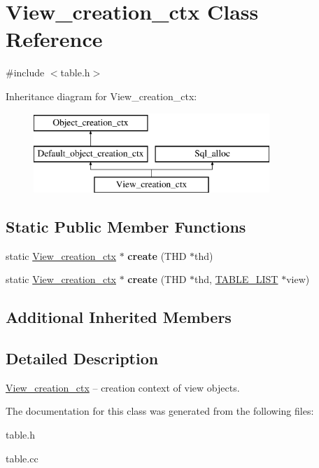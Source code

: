 \hypertarget{classView__creation__ctx}{}\section{View\+\_\+creation\+\_\+ctx Class Reference}
\label{classView__creation__ctx}


{\ttfamily \#include $<$table.\+h$>$}

Inheritance diagram for View\+\_\+creation\+\_\+ctx\+:\begin{figure}[H]
\begin{center}
\leavevmode
\includegraphics[height=3.000000cm]{classView__creation__ctx}
\end{center}
\end{figure}
\subsection*{Static Public Member Functions}
\begin{DoxyCompactItemize}
\item 
\mbox{\label{classView__creation__ctx_a33e3e418ba5867222080f959ceda6c57}} 
static \mbox{\hyperlink{classView__creation__ctx}{View\+\_\+creation\+\_\+ctx}} $\ast$ {\bfseries create} (T\+HD $\ast$thd)
\item 
\mbox{\label{classView__creation__ctx_a830b549cb83d6698f00f4cc5940a6a17}} 
static \mbox{\hyperlink{classView__creation__ctx}{View\+\_\+creation\+\_\+ctx}} $\ast$ {\bfseries create} (T\+HD $\ast$thd, \mbox{\hyperlink{structTABLE__LIST}{T\+A\+B\+L\+E\+\_\+\+L\+I\+ST}} $\ast$view)
\end{DoxyCompactItemize}
\subsection*{Additional Inherited Members}


\subsection{Detailed Description}
\mbox{\hyperlink{classView__creation__ctx}{View\+\_\+creation\+\_\+ctx}} -- creation context of view objects. 

The documentation for this class was generated from the following files\+:\begin{DoxyCompactItemize}
\item 
table.\+h\item 
table.\+cc\end{DoxyCompactItemize}
